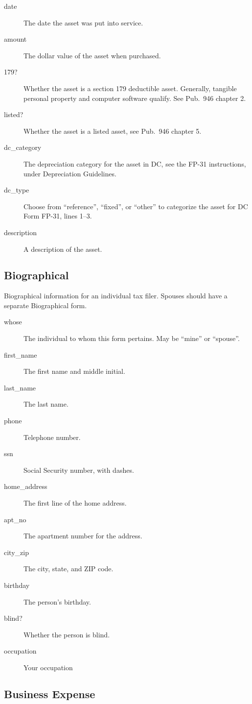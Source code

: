 \documentclass[12pt]{article}
\begin{document}
\begin{description}
\item[date] The date the asset was put into service.
\item[amount] The dollar value of the asset when purchased.
\item[179?] Whether the asset is a section 179 deductible asset. Generally,
tangible personal property and computer software qualify. See Pub.~946 chapter
2.
\item[listed?] Whether the asset is a listed asset, see Pub.~946 chapter 5.
\item[dc\_category] The depreciation category for the asset in DC, see the FP-31
instructions, under Depreciation Guidelines.
\item[dc\_type] Choose from ``reference'', ``fixed'', or ``other'' to categorize
the asset for DC Form FP-31, lines 1--3.
\item[description] A description of the asset.
\end{description}


\subsection{Biographical}

Biographical information for an individual tax filer. Spouses should have a
separate Biographical form.

\begin{description}
\item[whose] The individual to whom this form pertains. May be ``mine'' or
``spouse''.
\item[first\_name] The first name and middle initial.
\item[last\_name] The last name.
\item[phone] Telephone number.
\item[ssn] Social Security number, with dashes.
\item[home\_address] The first line of the home address.
\item[apt\_no] The apartment number for the address.
\item[city\_zip] The city, state, and ZIP code.
\item[birthday] The person's birthday.
\item[blind?] Whether the person is blind.
\item[occupation] Your occupation
\end{description}

\subsection{Business Expense}
\end{document}

